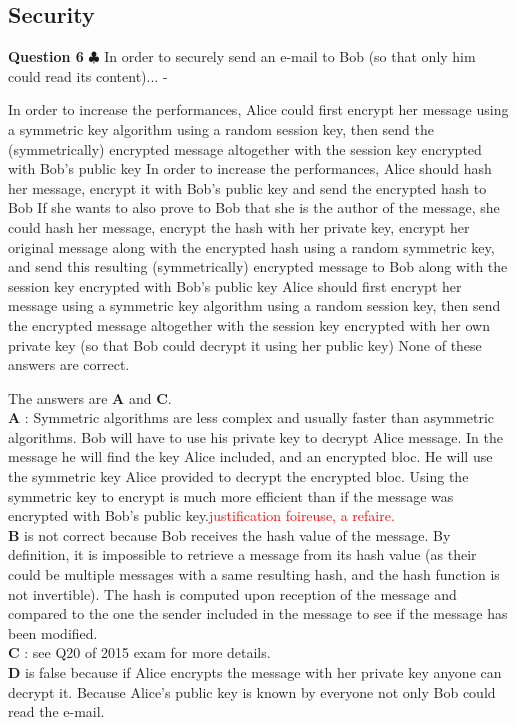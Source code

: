 \documentclass[en]{sourcefiles/eplexam}
\newcounter{choice}
\renewcommand\thechoice{\textbf{\Alph{choice}}}
\newcommand\choicelabel{\thechoice$\quad$}
\newenvironment{choices}%
  {\list{\choicelabel}%
     {\usecounter{choice}\def\makelabel##1{\hss\llap{##1}}%
       \settowidth{\leftmargin}{W.\hskip\labelsep\hskip 2.5em}%
       \def\choice{%
         \item
       } %
       \labelwidth\leftmargin\advance\labelwidth-\labelsep
       \topsep=0pt
       \partopsep=0pt
     }%
  }%
  {\endlist}
\begin{document}
\subsection{Security}
\textbf{Question 6} $\clubsuit$ In order to securely send an e-mail to Bob (so that only him could read its content)...
\begin{choices}
     \choice In order to increase the performances, Alice could first encrypt her message using a symmetric key algorithm using a random session key, then send the (symmetrically) encrypted message altogether with the session key encrypted with Bob's public key
     \choice In order to increase the performances, Alice should hash her message, encrypt it with Bob's public key and send the encrypted hash to Bob
     \choice If she wants to also prove to Bob that she is the author of the message, she could hash her message, encrypt the hash with her private key, encrypt her original message along with the encrypted hash using a random symmetric key, and send this resulting (symmetrically) encrypted message to Bob along with the session key encrypted with Bob's public key
     \choice Alice should first encrypt her message using a symmetric key algorithm using a random session key, then send the encrypted message altogether with the session key encrypted with her own private key (so that Bob could decrypt it using her public key)
     \choice None of these answers are correct.
\end{choices}
\begin{solution}
The answers are \textbf{A} and \textbf{C}. \\

\noindent \textbf{A} : Symmetric algorithms are less complex and usually faster than asymmetric algorithms. Bob will have to use his private key to decrypt Alice message. In the message he will find the key Alice included, and an encrypted bloc. He will use the symmetric key Alice provided to decrypt the encrypted bloc. Using the symmetric key to encrypt is much more efficient than if the message was encrypted with Bob's public key.\textcolor{red}{justification foireuse, a refaire.}\\ 

\noindent \textbf{B} is not correct because Bob receives the hash value of the message. By definition, it is impossible to retrieve a message from its hash value (as their could be multiple messages with a same resulting hash, and the hash function is not invertible). The hash is computed upon reception of the message and compared to the one the sender included in the message to see if the message has been modified. \\

\noindent \textbf{C} : see Q20 of 2015 exam for more details.\\

\noindent \textbf{D} is false because if Alice encrypts the message with her private key anyone can decrypt it. Because Alice's public key is known by everyone not only Bob could read the e-mail.
\end{solution}
\end{document}
